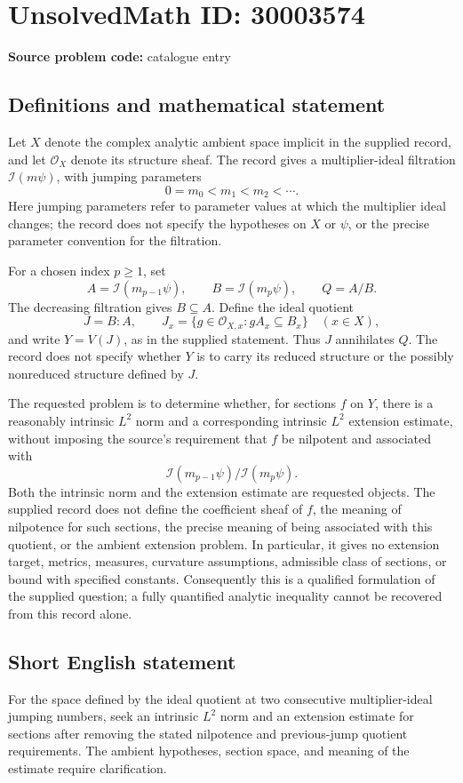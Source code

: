 \documentclass[11pt]{article}
\begin{document}
\section*{UnsolvedMath ID: 30003574}
\textbf{Source problem code:} catalogue entry
\subsection{Definitions and mathematical statement}
Let \(X\) denote the complex analytic ambient space implicit in the supplied record, and let \(\mathcal O_X\) denote its structure sheaf. The record gives a multiplier-ideal filtration \(\mathcal I(m\psi)\), with jumping parameters
\[
0=m_0<m_1<m_2<\cdots.
\]
Here jumping parameters refer to parameter values at which the multiplier ideal changes; the record does not specify the hypotheses on \(X\) or \(\psi\), or the precise parameter convention for the filtration.

For a chosen index \(p\geq 1\), set
\[
A=\mathcal I(m_{p-1}\psi),\qquad
B=\mathcal I(m_p\psi),\qquad
Q=A/B.
\]
The decreasing filtration gives \(B\subseteq A\). Define the ideal quotient
\[
J=B:A,
\qquad
J_x=\{g\in\mathcal O_{X,x}:gA_x\subseteq B_x\}
\quad (x\in X),
\]
and write \(Y=V(J)\), as in the supplied statement. Thus \(J\) annihilates \(Q\). The record does not specify whether \(Y\) is to carry its reduced structure or the possibly nonreduced structure defined by \(J\).

The requested problem is to determine whether, for sections \(f\) on \(Y\), there is a reasonably intrinsic \(L^2\) norm and a corresponding intrinsic \(L^2\) extension estimate, without imposing the source's requirement that \(f\) be nilpotent and associated with
\[
\mathcal I(m_{p-1}\psi)/\mathcal I(m_p\psi).
\]
Both the intrinsic norm and the extension estimate are requested objects. The supplied record does not define the coefficient sheaf of \(f\), the meaning of nilpotence for such sections, the precise meaning of being associated with this quotient, or the ambient extension problem. In particular, it gives no extension target, metrics, measures, curvature assumptions, admissible class of sections, or bound with specified constants. Consequently this is a qualified formulation of the supplied question; a fully quantified analytic inequality cannot be recovered from this record alone.
\subsection{Short English statement}
For the space defined by the ideal quotient at two consecutive multiplier-ideal jumping numbers, seek an intrinsic \(L^2\) norm and an extension estimate for sections after removing the stated nilpotence and previous-jump quotient requirements. The ambient hypotheses, section space, and meaning of the estimate require clarification.
\end{document}
